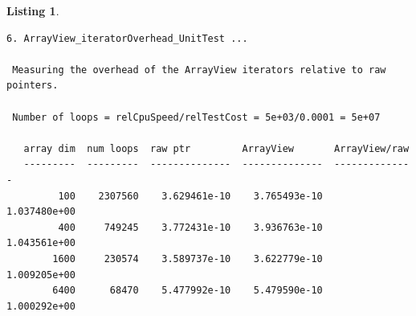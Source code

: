 \documentclass[pdf,ps2pdf,11pt]{SANDreport}
\newtheorem{listing}{Listing}
\begin{document}
\begin{listing}
{\begin{verbatim}
6. ArrayView_iteratorOverhead_UnitTest ... 
 
 Measuring the overhead of the ArrayView iterators relative to raw pointers.
 
 Number of loops = relCpuSpeed/relTestCost = 5e+03/0.0001 = 5e+07
 
   array dim  num loops  raw ptr         ArrayView       ArrayView/raw 
   ---------  ---------  --------------  --------------  --------------
         100    2307560    3.629461e-10    3.765493e-10    1.037480e+00
         400     749245    3.772431e-10    3.936763e-10    1.043561e+00
        1600     230574    3.589737e-10    3.622779e-10    1.009205e+00
        6400      68470    5.477992e-10    5.479590e-10    1.000292e+00
\end{verbatim}}
\end{listing}

\pagebreak
\end{document}
